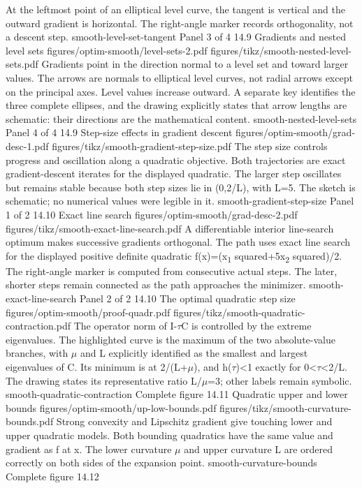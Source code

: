 {At the leftmost point of an elliptical level curve, the tangent is vertical and the outward gradient is horizontal. The right-angle marker records orthogonality, not a descent step.}
{smooth-level-set-tangent}
{Panel 3 of 4}
{14.9}
{Gradients and nested level sets}
{figures/optim-smooth/level-sets-2.pdf}
{figures/tikz/smooth-nested-level-sets.pdf}
{Gradients point in the direction normal to a level set and toward larger values.}
{The arrows are normals to elliptical level curves, not radial arrows except on the principal axes. Level values increase outward. A separate key identifies the three complete ellipses, and the drawing explicitly states that arrow lengths are schematic: their directions are the mathematical content.}
{smooth-nested-level-sets}
{Panel 4 of 4}
{14.9}
{Step-size effects in gradient descent}
{figures/optim-smooth/grad-desc-1.pdf}
{figures/tikz/smooth-gradient-step-size.pdf}
{The step size controls progress and oscillation along a quadratic objective.}
{Both trajectories are exact gradient-descent iterates for the displayed quadratic. The larger step oscillates but remains stable because both step sizes lie in (0,2/L), with L=5. The sketch is schematic; no numerical values were legible in it.}
{smooth-gradient-step-size}
{Panel 1 of 2}
{14.10}
{Exact line search}
{figures/optim-smooth/grad-desc-2.pdf}
{figures/tikz/smooth-exact-line-search.pdf}
{A differentiable interior line-search optimum makes successive gradients orthogonal.}
{The path uses exact line search for the displayed positive definite quadratic f(x)=(x\textsubscript{1} squared+5x\textsubscript{2} squared)/2. The right-angle marker is computed from consecutive actual steps. The later, shorter steps remain connected as the path approaches the minimizer.}
{smooth-exact-line-search}
{Panel 2 of 2}
{14.10}
{The optimal quadratic step size}
{figures/optim-smooth/proof-quadr.pdf}
{figures/tikz/smooth-quadratic-contraction.pdf}
{The operator norm of I-\ensuremath{\tau}C is controlled by the extreme eigenvalues.}
{The highlighted curve is the maximum of the two absolute-value branches, with \ensuremath{\mu} and L explicitly identified as the smallest and largest eigenvalues of C. Its minimum is at 2/(L+\ensuremath{\mu}), and h(\ensuremath{\tau})<1 exactly for 0<\ensuremath{\tau}<2/L. The drawing states its representative ratio L/\ensuremath{\mu}=3; other labels remain symbolic.}
{smooth-quadratic-contraction}
{Complete figure}
{14.11}
{Quadratic upper and lower bounds}
{figures/optim-smooth/up-low-bounds.pdf}
{figures/tikz/smooth-curvature-bounds.pdf}
{Strong convexity and Lipschitz gradient give touching lower and upper quadratic models.}
{Both bounding quadratics have the same value and gradient as f at x. The lower curvature \ensuremath{\mu} and upper curvature L are ordered correctly on both sides of the expansion point.}
{smooth-curvature-bounds}
{Complete figure}
{14.12}
